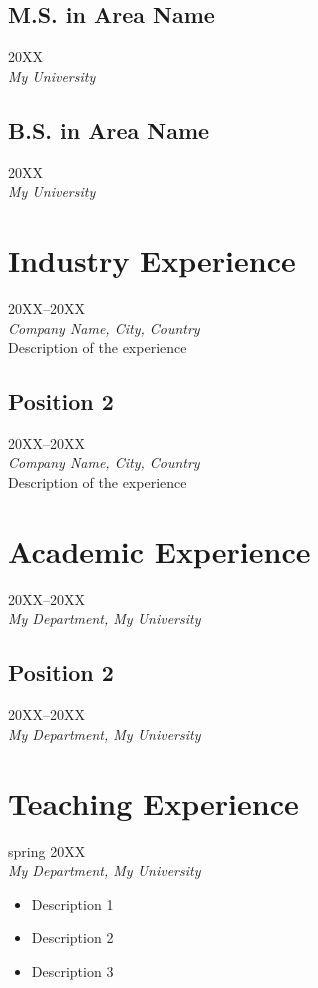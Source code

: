 	\subsection{M.S. in Area Name} \hfill 20XX\\
	\textsl{My University}
	
	\subsection{B.S. in Area Name} \hfill 20XX\\
	\textsl{My University}

    \section{Industry Experience}
     \hfill 20XX--20XX\\
	\textsl{Company Name, City, Country}\\
	Description of the experience
	
    \subsection{Position 2} \hfill 20XX--20XX\\
	\textsl{Company Name, City, Country}\\
	Description of the experience

    \section{Academic Experience}
	 \hfill 20XX--20XX\\
	\textsl{My Department, My University}

	\subsection{Position 2} \hfill 20XX--20XX\\
	\textsl{My Department, My University}

	\section{Teaching Experience}
	 \hfill spring 20XX\\
	\textsl{My Department, My University}
	\begin{itemize}
		\item Description 1
		\item Description 2
		\item Description 3
	\end{itemize}

